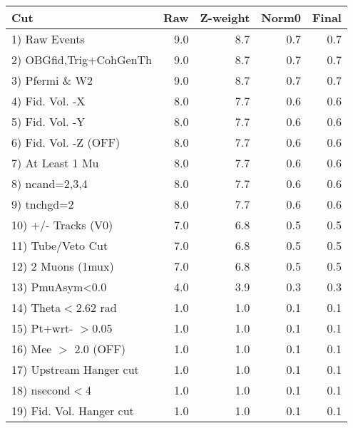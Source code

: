  \begin{table}[h!]\centering
 \begin{tabular}{||l||r|r|r|r||}
 \hline
 \hline
 Cut & Raw & Z-weight & Norm0 & Final \\
 \hline
  1) Raw Events           &         9.0 &         8.7 &         0.7 &         0.7 \\
  2) OBGfid,Trig+CohGenTh &         9.0 &         8.7 &         0.7 &         0.7 \\
  3) Pfermi \& W2         &         9.0 &         8.7 &         0.7 &         0.7 \\
  4) Fid. Vol. -X         &         8.0 &         7.7 &         0.6 &         0.6 \\
  5) Fid. Vol. -Y         &         8.0 &         7.7 &         0.6 &         0.6 \\
  6) Fid. Vol. -Z (OFF)   &         8.0 &         7.7 &         0.6 &         0.6 \\
  7) At Least 1 Mu        &         8.0 &         7.7 &         0.6 &         0.6 \\
  8) ncand=2,3,4          &         8.0 &         7.7 &         0.6 &         0.6 \\
  9) tnchgd=2             &         8.0 &         7.7 &         0.6 &         0.6 \\
 10) +/- Tracks (V0)      &         7.0 &         6.8 &         0.5 &         0.5 \\
 11) Tube/Veto Cut        &         7.0 &         6.8 &         0.5 &         0.5 \\
 12) 2 Muons (1mux)       &         7.0 &         6.8 &         0.5 &         0.5 \\
 13) PmuAsym<0.0          &         4.0 &         3.9 &         0.3 &         0.3 \\
 14) Theta$<$2.62 rad     &         1.0 &         1.0 &         0.1 &         0.1 \\
 15) Pt+wrt- $>$0.05      &         1.0 &         1.0 &         0.1 &         0.1 \\
 16) Mee $>$ 2.0  (OFF)   &         1.0 &         1.0 &         0.1 &         0.1 \\
 17) Upstream Hanger cut  &         1.0 &         1.0 &         0.1 &         0.1 \\
 18) nsecond$<$4          &         1.0 &         1.0 &         0.1 &         0.1 \\
 19) Fid. Vol. Hanger cut &         1.0 &         1.0 &         0.1 &         0.1 \\

\end{tabular}
\end{table}

